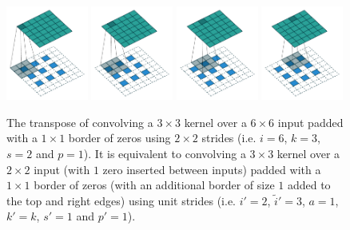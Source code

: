 \documentclass{report}
\begin{document}
\begin{figure}[p]
    \centering
    \includegraphics[width=0.24\textwidth]{pdf/padding_strides_odd_transposed_00.pdf}
    \includegraphics[width=0.24\textwidth]{pdf/padding_strides_odd_transposed_01.pdf}
    \includegraphics[width=0.24\textwidth]{pdf/padding_strides_odd_transposed_02.pdf}
    \includegraphics[width=0.24\textwidth]{pdf/padding_strides_odd_transposed_03.pdf}
    \caption{\label{fig:padding_strides_odd_transposed} The transpose of
        convolving a $3 \times 3$ kernel over a $6 \times 6$ input padded with a
        $1 \times 1$ border of zeros using $2 \times 2$ strides (i.e. $i = 6$,
        $k = 3$, $s = 2$ and $p = 1$). It is equivalent to convolving a $3
        \times 3$ kernel over a $2 \times 2$ input (with $1$ zero inserted
        between inputs) padded with a $1 \times 1$ border of zeros (with an
        additional border of size $1$ added to the top and right edges) using
        unit strides (i.e. $i' = 2$, $\tilde{i}' = 3$, $a = 1$, $k' = k$, $s' =
        1$ and $p' = 1$).}
\end{figure}



\end{document}
